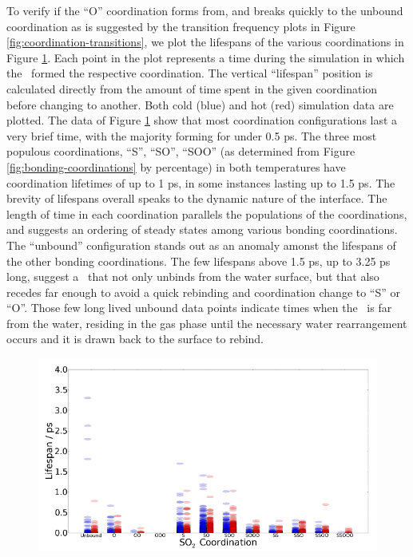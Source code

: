 To verify if the ``O'' coordination forms from, and breaks quickly to the unbound coordination as is suggested by the transition frequency plots in Figure \ref{fig:coordination-transitions}, we plot the lifespans of the various coordinations in Figure \ref{fig:coordination-lifespans}. Each point in the plot represents a time during the simulation in which the \suldiox~formed the respective coordination. The vertical ``lifespan'' position is calculated directly from the amount of time spent in the given coordination before changing to another. Both cold (blue) and hot (red) simulation data are plotted. The data of Figure \ref{fig:coordination-lifespans} show that most coordination configurations last a very brief time, with the majority forming for under 0.5 ps. The three most populous coordinations, ``S'', ``SO'', ``SOO'' (as determined from Figure \ref{fig:bonding-coordinations} by percentage) in both temperatures have coordination lifetimes of up to 1 ps, in some instances lasting up to 1.5 ps. The brevity of lifespans overall speaks to the dynamic nature of the interface. The length of time in each coordination parallels the populations of the coordinations, and suggests an ordering of steady states among various bonding coordinations. The ``unbound'' configuration stands out as an anomaly amonst the lifespans of the other bonding coordinations. The few lifespans above 1.5 ps, up to 3.25 ps long, suggest a \suldiox~that not only unbinds from the water surface, but that also recedes far enough to avoid a quick rebinding and coordination change to ``S'' or ``O''. Those few long lived unbound data points indicate times when the \suldiox~is far from the water, residing in the gas phase until the necessary water rearrangement occurs and it is drawn back to the surface to rebind.

\begin{figure}[h!]
	\begin{center}
		\includegraphics[scale=1.0]{images/coordinations/coordination-lifespans.png}
		\caption{}
		\label{fig:coordination-lifespans}
	\end{center}
\end{figure}

